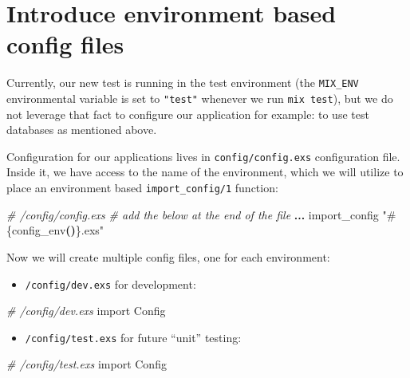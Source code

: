 \documentclass[
  oneside]{book}
\newenvironment{Shaded}{\begin{snugshade}}{\end{snugshade}}
\newcommand{\CommentTok}[1]{\textcolor[rgb]{0.56,0.35,0.01}{\textit{#1}}}
\newcommand{\ConstantTok}[1]{\textcolor[rgb]{0.56,0.35,0.01}{#1}}
\newcommand{\FunctionTok}[1]{\textcolor[rgb]{0.13,0.29,0.53}{\textbf{#1}}}
\newcommand{\ImportTok}[1]{#1}
\newcommand{\NormalTok}[1]{#1}
\newcommand{\OperatorTok}[1]{\textcolor[rgb]{0.81,0.36,0.00}{\textbf{#1}}}
\newcommand{\OtherTok}[1]{\textcolor[rgb]{0.56,0.35,0.01}{#1}}
\newcommand{\StringTok}[1]{\textcolor[rgb]{0.31,0.60,0.02}{#1}}
\providecommand{\tightlist}{%
  \setlength{\itemsep}{0pt}\setlength{\parskip}{0pt}}
\begin{document}
\section{Introduce environment based config files}\label{introduce-environment-based-config-files}

Currently, our new test is running in the test environment (the \texttt{MIX\_ENV} environmental variable is set to \texttt{"test"} whenever we run \texttt{mix\ test}), but we do not leverage that fact to configure our application for example: to use test databases as mentioned above.

Configuration for our applications lives in \texttt{config/config.exs} configuration file. Inside it, we have access to the name of the environment, which we will utilize to place an environment based \texttt{import\_config/1} function:

\begin{Shaded}
\begin{Highlighting}[]
\CommentTok{\# /config/config.exs}
\CommentTok{\# add the below at the end of the file}
\OperatorTok{...}
\NormalTok{import\_config }\StringTok{"}\OtherTok{\#\{}\NormalTok{config\_env}\FunctionTok{()}\OtherTok{\}}\StringTok{.exs"}
\end{Highlighting}
\end{Shaded}

Now we will create multiple config files, one for each environment:

\begin{itemize}
\tightlist
\item
  \texttt{/config/dev.exs} for development:
\end{itemize}

\begin{Shaded}
\begin{Highlighting}[]
\CommentTok{\# /config/dev.exs}
\ImportTok{import} \ConstantTok{Config}
\end{Highlighting}
\end{Shaded}

\newpage

\begin{itemize}
\tightlist
\item
  \texttt{/config/test.exs} for future ``unit'' testing:
\end{itemize}

\begin{Shaded}
\begin{Highlighting}[]
\CommentTok{\# /config/test.exs}
\ImportTok{import} \ConstantTok{Config}
\end{Highlighting}
\end{Shaded}
\end{document}

